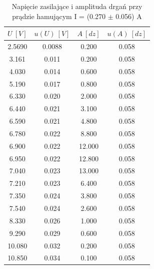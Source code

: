\documentclass[12pt, a4paper, oneside]{article}
\begin{document}
\begin{table}[h]
  \centering
  \caption{Napięcie zasilające i amplituda drgań przy prądzie hamującym I = (0.270 $\pm$ 0.056) A}
    \begin{tabular}{|c|c|c|c|}\hline
    $U~[V]$ & $u(U)~[V]$ & $A~[dz]$ & $u(A)~[dz]$ \\\hline
    2.5690 & 0.0088 & 0.200 & 0.058 \\\hline
    3.161 & 0.011 & 0.200 & 0.058 \\\hline
    4.030 & 0.014 & 0.600 & 0.058 \\\hline
    5.190 & 0.017 & 0.800 & 0.058 \\\hline
    6.330 & 0.020 & 2.000 & 0.058 \\\hline
    6.440 & 0.021 & 3.100 & 0.058 \\\hline
    6.590 & 0.021 & 4.800 & 0.058 \\\hline
    6.780 & 0.022 & 8.800 & 0.058 \\\hline
    6.900 & 0.022 & 12.000 & 0.058 \\\hline
    6.950 & 0.022 & 12.800 & 0.058 \\\hline
    7.040 & 0.023 & 13.000 & 0.058 \\\hline
    7.210 & 0.023 & 6.400 & 0.058 \\\hline
    7.350 & 0.024 & 3.800 & 0.058 \\\hline
    7.540 & 0.024 & 2.600 & 0.058 \\\hline
    8.330 & 0.026 & 1.000 & 0.058 \\\hline
    9.290 & 0.029 & 0.600 & 0.058 \\\hline
    10.080 & 0.032 & 0.200 & 0.058 \\\hline
    10.850 & 0.034 & 0.100 & 0.058 \\\hline
    \end{tabular}%
  \label{tab:addlabel}%
\end{table}%
\end{document}
